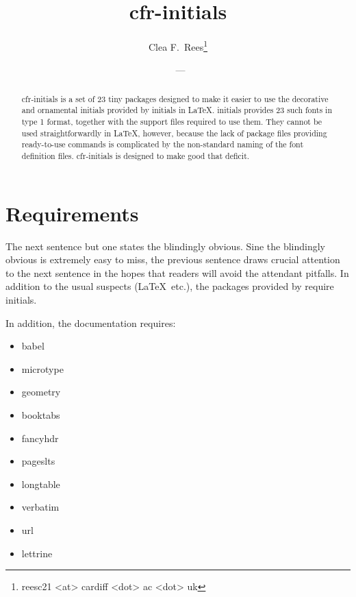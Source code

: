 \documentclass[11pt,british,a4paper]{article}
\title{cfr-initials}
\author{Clea F.\ Rees\footnote{reesc21 <at> cardiff <dot> ac <dot> uk}}
\date{\fyversion\ --- \dyddiad}
\begin{document}
\maketitle\thispagestyle{empty}
\newcommand*{\lpack}[1]{\textsf{#1}}

\begin{abstract}
  \hspace*{-\parindent}\lpack{cfr-initials} is a set of 23 tiny packages designed to make it easier to use the decorative and ornamental initials provided by \lpack{initials} in \LaTeX.
  \lpack{initials} provides 23 such fonts in type 1 format, together with the support files required to use them.
  They cannot be used straightforwardly in \LaTeX, however, because the lack of package files providing ready-to-use commands is complicated by the non-standard naming of the font definition files.
  \lpack{cfr-initials} is designed to make good that deficit.
\end{abstract}

\section{Requirements}\label{sec:require}

The next sentence but one states the blindingly obvious.
Sine the blindingly obvious is extremely easy to miss, the previous sentence draws crucial attention to the next sentence in the hopes that readers will avoid the attendant pitfalls.
In addition to the usual suspects (\LaTeX\ etc.), the packages provided by  require \lpack{initials}.

In addition, the documentation requires:
\begin{itemize}
  \item \lpack{babel}
  \item \lpack{microtype}
  \item \lpack{geometry}
  \item \lpack{booktabs}
  \item \lpack{fancyhdr}
  \item \lpack{pageslts}
  \item \lpack{longtable}
  \item \lpack{verbatim}
  \item \lpack{url}
  \item \lpack{lettrine}
\end{itemize}
\end{document}
